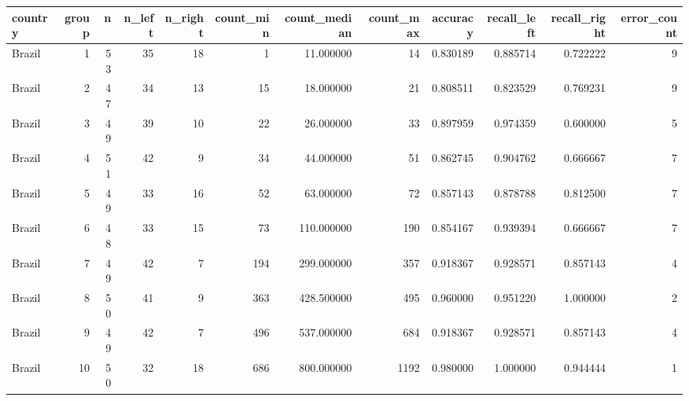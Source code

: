 \begin{tabular}{lrrrrrrrrrrr}
\toprule
country & group & n & n_left & n_right & count_min & count_median & count_max & accuracy & recall_left & recall_right & error_count \\
\midrule
Brazil & 1 & 53 & 35 & 18 & 1 & 11.000000 & 14 & 0.830189 & 0.885714 & 0.722222 & 9 \\
Brazil & 2 & 47 & 34 & 13 & 15 & 18.000000 & 21 & 0.808511 & 0.823529 & 0.769231 & 9 \\
Brazil & 3 & 49 & 39 & 10 & 22 & 26.000000 & 33 & 0.897959 & 0.974359 & 0.600000 & 5 \\
Brazil & 4 & 51 & 42 & 9 & 34 & 44.000000 & 51 & 0.862745 & 0.904762 & 0.666667 & 7 \\
Brazil & 5 & 49 & 33 & 16 & 52 & 63.000000 & 72 & 0.857143 & 0.878788 & 0.812500 & 7 \\
Brazil & 6 & 48 & 33 & 15 & 73 & 110.000000 & 190 & 0.854167 & 0.939394 & 0.666667 & 7 \\
Brazil & 7 & 49 & 42 & 7 & 194 & 299.000000 & 357 & 0.918367 & 0.928571 & 0.857143 & 4 \\
Brazil & 8 & 50 & 41 & 9 & 363 & 428.500000 & 495 & 0.960000 & 0.951220 & 1.000000 & 2 \\
Brazil & 9 & 49 & 42 & 7 & 496 & 537.000000 & 684 & 0.918367 & 0.928571 & 0.857143 & 4 \\
Brazil & 10 & 50 & 32 & 18 & 686 & 800.000000 & 1192 & 0.980000 & 1.000000 & 0.944444 & 1 \\
\bottomrule
\end{tabular}
